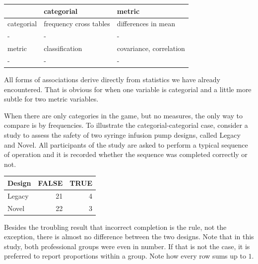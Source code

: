 \documentclass[]{svmono}
\newenvironment{Shaded}{\begin{snugshade}}{\end{snugshade}}
\newcommand{\KeywordTok}[1]{\textcolor[rgb]{0.13,0.29,0.53}{\textbf{#1}}}
\newcommand{\DataTypeTok}[1]{\textcolor[rgb]{0.13,0.29,0.53}{#1}}
\newcommand{\DecValTok}[1]{\textcolor[rgb]{0.00,0.00,0.81}{#1}}
\newcommand{\StringTok}[1]{\textcolor[rgb]{0.31,0.60,0.02}{#1}}
\newcommand{\OperatorTok}[1]{\textcolor[rgb]{0.81,0.36,0.00}{\textbf{#1}}}
\newcommand{\NormalTok}[1]{#1}
\begin{document}
\begin{longtable}[]{@{}lll@{}}
\toprule
& categorial & metric\tabularnewline
\midrule
\endhead
categorial & frequency cross tables & differences in mean\tabularnewline
- & - & -\tabularnewline
metric & classification & covariance, correlation\tabularnewline
- & - & -\tabularnewline
\bottomrule
\end{longtable}

All forms of associations derive directly from statistics we have
already encountered. That is obvious for when one variable is categorial
and a little more subtle for two metric variables.

When there are only categories in the game, but no measures, the only
way to compare is by frequencies. To illustrate the
categorial-categorial case, consider a study to assess the safety of two
syringe infusion pump designs, called Legacy and Novel. All participants
of the study are asked to perform a typical sequence of operation and it
is recorded whether the sequence was completed correctly or not.

\begin{Shaded}
\end{Shaded}

\begin{tabular}{l|r|r}
\hline
Design & FALSE & TRUE\\
\hline
Legacy & 21 & 4\\
\hline
Novel & 22 & 3\\
\hline
\end{tabular}

Besides the troubling result that incorrect completion is the rule, not
the exception, there is almost no difference between the two designs.
Note that in this study, both professional groups were even in number.
If that is not the case, it is preferred to report proportions within a
group. Note how every row sums up to \(1\).
\end{document}

